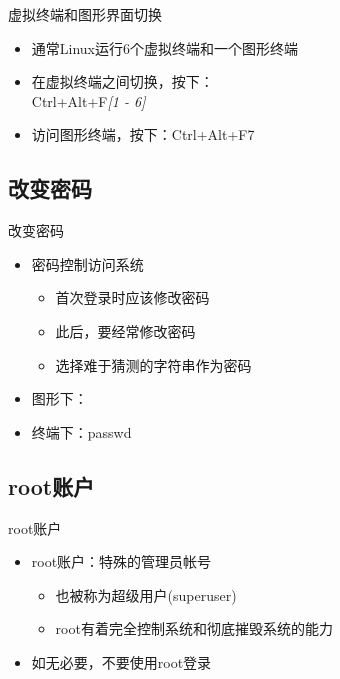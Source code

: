 \begin{frame}{虚拟终端和图形界面切换}
\begin{itemize}
\item 通常Linux运行6个虚拟终端和一个图形终端
\item 在虚拟终端之间切换，按下：\\
Ctrl+Alt+F\emph{{[}1 - 6{]}}
\item 访问图形终端，按下：Ctrl+Alt+F7
\end{itemize}

\end{frame}

\subsection{改变密码}


\begin{frame}{改变密码 }
\begin{itemize}
\item 密码控制访问系统

\begin{itemize}
\item 首次登录时应该修改密码
\item 此后，要经常修改密码
\item 选择难于猜测的字符串作为密码
\end{itemize}
\item 图形下：
\item 终端下：passwd
\end{itemize}

\end{frame}

\subsection{root账户}


\begin{frame}{root账户}
\begin{itemize}
\item root账户：特殊的管理员帐号

\begin{itemize}
\item 也被称为超级用户(superuser)
\item root有着完全控制系统和彻底摧毁系统的能力
\end{itemize}
\item 如无必要，不要使用root登录
\end{itemize}

\end{frame}

